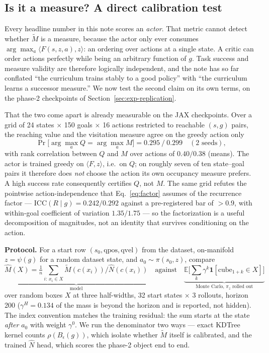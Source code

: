 \documentclass[10pt]{article}
\newcommand{\E}{\mathbb{E}}
\newcommand{\ind}[1]{\mathbf{1}\!\left[#1\right]}
\begin{document}
\subsection{Is it a measure? A direct calibration test}
\label{sec:exp-calib}

Every headline number in this note scores an \emph{actor}. That metric cannot
detect whether $\tilde M$ is a measure, because the actor only ever consumes
$\arg\max_a \langle F(s,z,a),z\rangle$: an ordering over actions at a single
state. A critic can order actions perfectly while being an arbitrary function of
$g$. Task success and measure validity are therefore logically independent, and
the note has so far conflated ``the curriculum trains stably to a good policy''
with ``the curriculum learns a successor measure.'' We now test the second claim
on its own terms, on the phase-2 checkpoints of
Section~\ref{sec:exp-replication}.

That the two come apart is already measurable on the JAX checkpoints. Over a
grid of 24 states $\times$ 150 goals $\times$ 16 actions restricted to reachable
$(s,g)$ pairs, the reaching value and the visitation measure agree on the greedy
action only
\[
\Pr\big[\arg\max_a Q = \arg\max_a M\big] = 0.295 \ / \ 0.299 \quad(\text{2 seeds}),
\]
with rank correlation between $Q$ and $M$ over actions of $0.40/0.38$ (means).
The actor is trained greedy on $\langle F,z\rangle$, i.e.\ on $Q$; on roughly
seven of ten state--goal pairs it therefore does \emph{not} choose the action its
own occupancy measure prefers. A high success rate consequently certifies $Q$,
not $M$. The same grid refutes the pointwise action-independence that
Eq.~\ref{eq:factor} assumes of the recurrence factor --- $\mathrm{ICC}(R\mid g) =
0.242/0.292$ against a pre-registered bar of ${>}0.9$, with within-goal
coefficient of variation $1.35/1.75$ --- so the factorization is a useful
decomposition of magnitudes, not an identity that survives conditioning on the
action.

\textbf{Protocol.} For a start row $(s_0,\mathrm{qpos},\mathrm{qvel})$ from the
dataset, on-manifold $z=\psi(g)$ for a random dataset state, and
$a_0\sim\pi(s_0,z)$, compare
\[
\underbrace{\hat M(X)=\tfrac1n\!\!\sum_{i:\,x_i\in X}\!\!\tilde M(c(x_i))/\hat
N(c(x_i))}_{\text{model}}
\quad\text{against}\quad
\underbrace{\textstyle\E\big[\sum_k \gamma^k\ind{\mathrm{cube}_{1+k}\in
X}\big]}_{\text{Monte Carlo, }\pi_z\text{ rolled out}}
\]
over random boxes $X$ at three half-widths, 32 start states $\times$ 3 rollouts,
horizon 200 ($\gamma^{H}=0.134$ of the mass is beyond the horizon and is
reported, not hidden). The index convention matches the training residual: the
sum starts at the state \emph{after} $a_0$ with weight $\gamma^0$. We run the
denominator two ways --- exact KDTree kernel counts $\rho(B_\epsilon(g))$, which
isolate whether $\tilde M$ itself is calibrated, and the trained $\hat N$ head,
which scores the phase-2 object end to end.
\end{document}
